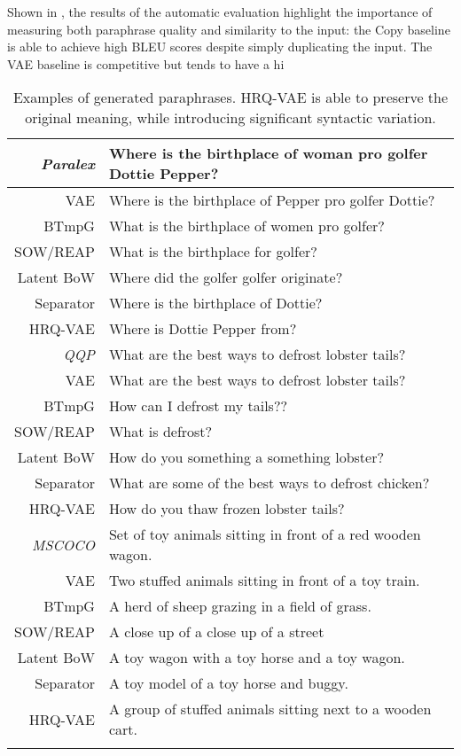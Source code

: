 \documentclass[11pt]{article}
\begin{document}
Shown in , the results of the automatic evaluation highlight the importance of measuring both paraphrase quality and similarity to the input: the Copy baseline is able to achieve high BLEU scores despite simply duplicating the input. The VAE baseline is competitive but tends to have a hi\begin{table}[t]
    \small
    \centering
    \begin{tabular}{@{}r@{~}|@{~}p{6cm}@{}}
    \hhline{==} 
\textit{Paralex} & Where is the birthplace of woman pro golfer Dottie Pepper? \\
    \hline
    {VAE} & Where is the birthplace of Pepper pro golfer Dottie? \\
    {BTmpG} & What is the birthplace of women pro golfer? \\
    {SOW/REAP} &  What is the birthplace for golfer? \\
    {Latent BoW} & Where did the golfer golfer originate? \\
    {Separator} &  Where is the birthplace of Dottie? \\
    {HRQ-VAE} &  Where is Dottie Pepper from? \\
    \hhline{==} 	 
\textit{QQP} & What are the best ways to defrost lobster tails? \\
    \hline
    {VAE} &   What are the best ways to defrost lobster tails? \\
    {BTmpG} &  How can I defrost my tails?? \\
    {SOW/REAP} & What is defrost? \\
    {Latent BoW} &  How do you something a something lobster? \\
    {Separator} &  What are some of the best ways to defrost chicken? \\
    {HRQ-VAE} & How do you thaw frozen lobster tails? \\
    \hhline{==}


\textit{MSCOCO} & Set of toy animals sitting in front of a red wooden wagon. \\
    \hline
    {VAE} &  Two stuffed animals sitting in front of a toy train. \\
    {BTmpG} &   A herd of sheep grazing in a field of grass. \\
    {SOW/REAP} & A close up of a close up of a street \\
    {Latent BoW} & A toy wagon with a toy horse and a toy wagon. \\
    {Separator} &  A toy model of a toy horse and buggy. \\
    {HRQ-VAE} & A group of stuffed animals sitting next to a wooden cart. \\
    \hhline{==}
    \end{tabular}
\caption{Examples of generated paraphrases. HRQ-VAE is able to preserve the original meaning, while introducing significant syntactic variation.}
    
\label{tab:examples} 
    
\end{table}
\end{document}

